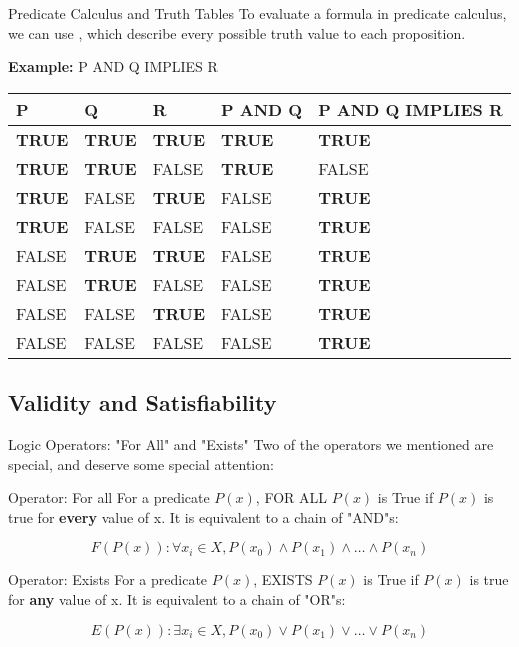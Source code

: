\begin{frame}{Predicate Calculus and Truth Tables}
  To evaluate a formula in predicate calculus, we can use , which describe every possible truth value to each proposition.\bigskip

  {\bf Example:} P AND Q IMPLIES R\bigskip

  \begin{tabular}{|lll|l|l|}
    P & Q & R & P AND Q & P AND Q IMPLIES R\\
    \hline
    {\bf TRUE} & {\bf TRUE} & {\bf TRUE} & {\bf TRUE} & {\bf TRUE} \\
    {\bf TRUE} & {\bf TRUE} & FALSE & {\bf TRUE} & FALSE \\
    {\bf TRUE} & FALSE & {\bf TRUE} & FALSE & {\bf TRUE} \\
    {\bf TRUE} & FALSE & FALSE & FALSE & {\bf TRUE} \\
    FALSE & {\bf TRUE} & {\bf TRUE} & FALSE & {\bf TRUE} \\
    FALSE & {\bf TRUE} & FALSE & FALSE & {\bf TRUE} \\
    FALSE & FALSE & {\bf TRUE} & FALSE & {\bf TRUE} \\
    FALSE & FALSE & FALSE & FALSE & {\bf TRUE} \\
  \end{tabular}
\end{frame}


\subsection{Validity and Satisfiability}

\begin{frame}{Logic Operators: "For All" and "Exists"}
  Two of the operators we mentioned are special, and deserve some special attention:

  \begin{block}{Operator: For all}
    For a predicate $P(x)$, FOR ALL $P(x)$ is True if $P(x)$ is true for {\bf every} value of x. It is equivalent to a chain of "AND"s:

    \[
      F(P(x)): \forall x_i \in X, P(x_0) \land P(x_1) \land \ldots \land P(x_n)
    \]

  \end{block}

  \begin{block}{Operator: Exists}
    For a predicate $P(x)$, EXISTS $P(x)$ is True if $P(x)$ is true for {\bf any} value of x. It is equivalent to a chain of "OR"s:

    \[
      E(P(x)): \exists x_i \in X, P(x_0) \lor P(x_1) \lor \ldots \lor P(x_n)
    \]
  \end{block}
\end{frame}

